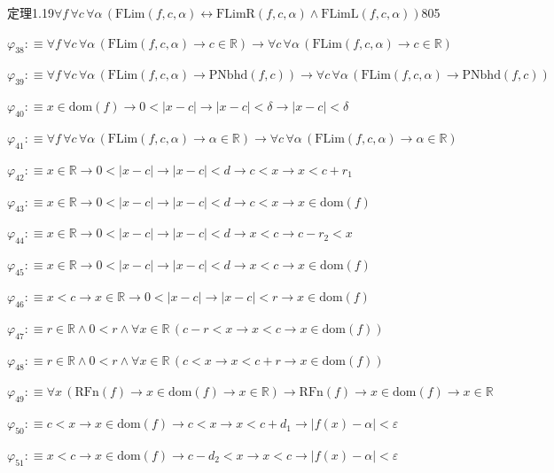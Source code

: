 \begin{fullproof}{定理1.19}{$\forall f\,\forall c\,\forall \alpha\,(\mathrm{FLim}(f,c,\alpha) \leftrightarrow \mathrm{FLimR}(f,c,\alpha) \land \mathrm{FLimL}(f,c,\alpha))$}{805}
\begin{abbrevlist}
\item $\varphi_{38} :\equiv \forall f\,\forall c\,\forall \alpha\,(\mathrm{FLim}(f,c,\alpha) \to c \in \mathbb{R}) \to \forall c\,\forall \alpha\,(\mathrm{FLim}(f,c,\alpha) \to c \in \mathbb{R})$
\item $\varphi_{39} :\equiv \forall f\,\forall c\,\forall \alpha\,(\mathrm{FLim}(f,c,\alpha) \to \mathrm{PNbhd}(f,c)) \to \forall c\,\forall \alpha\,(\mathrm{FLim}(f,c,\alpha) \to \mathrm{PNbhd}(f,c))$
\item $\varphi_{40} :\equiv x \in \mathrm{dom}(f) \to 0 < \lvert x - c \rvert \to \lvert x - c \rvert < \delta \to \lvert x - c \rvert < \delta$
\item $\varphi_{41} :\equiv \forall f\,\forall c\,\forall \alpha\,(\mathrm{FLim}(f,c,\alpha) \to \alpha \in \mathbb{R}) \to \forall c\,\forall \alpha\,(\mathrm{FLim}(f,c,\alpha) \to \alpha \in \mathbb{R})$
\item $\varphi_{42} :\equiv x \in \mathbb{R} \to 0 < \lvert x - c \rvert \to \lvert x - c \rvert < d \to c < x \to x < c + r_{1}$
\item $\varphi_{43} :\equiv x \in \mathbb{R} \to 0 < \lvert x - c \rvert \to \lvert x - c \rvert < d \to c < x \to x \in \mathrm{dom}(f)$
\item $\varphi_{44} :\equiv x \in \mathbb{R} \to 0 < \lvert x - c \rvert \to \lvert x - c \rvert < d \to x < c \to c - r_{2} < x$
\item $\varphi_{45} :\equiv x \in \mathbb{R} \to 0 < \lvert x - c \rvert \to \lvert x - c \rvert < d \to x < c \to x \in \mathrm{dom}(f)$
\item $\varphi_{46} :\equiv x < c \to x \in \mathbb{R} \to 0 < \lvert x - c \rvert \to \lvert x - c \rvert < r \to x \in \mathrm{dom}(f)$
\item $\varphi_{47} :\equiv r \in \mathbb{R} \land 0 < r \land \forall x \in \mathbb{R}\,(c - r < x \to x < c \to x \in \mathrm{dom}(f))$
\item $\varphi_{48} :\equiv r \in \mathbb{R} \land 0 < r \land \forall x \in \mathbb{R}\,(c < x \to x < c + r \to x \in \mathrm{dom}(f))$
\item $\varphi_{49} :\equiv \forall x\,(\mathrm{RFn}(f) \to x \in \mathrm{dom}(f) \to x \in \mathbb{R}) \to \mathrm{RFn}(f) \to x \in \mathrm{dom}(f) \to x \in \mathbb{R}$
\item $\varphi_{50} :\equiv c < x \to x \in \mathrm{dom}(f) \to c < x \to x < c + d_{1} \to \lvert f(x) - \alpha \rvert < \varepsilon$
\item $\varphi_{51} :\equiv x < c \to x \in \mathrm{dom}(f) \to c - d_{2} < x \to x < c \to \lvert f(x) - \alpha \rvert < \varepsilon$

\end{abbrevlist}
\end{fullproof}
